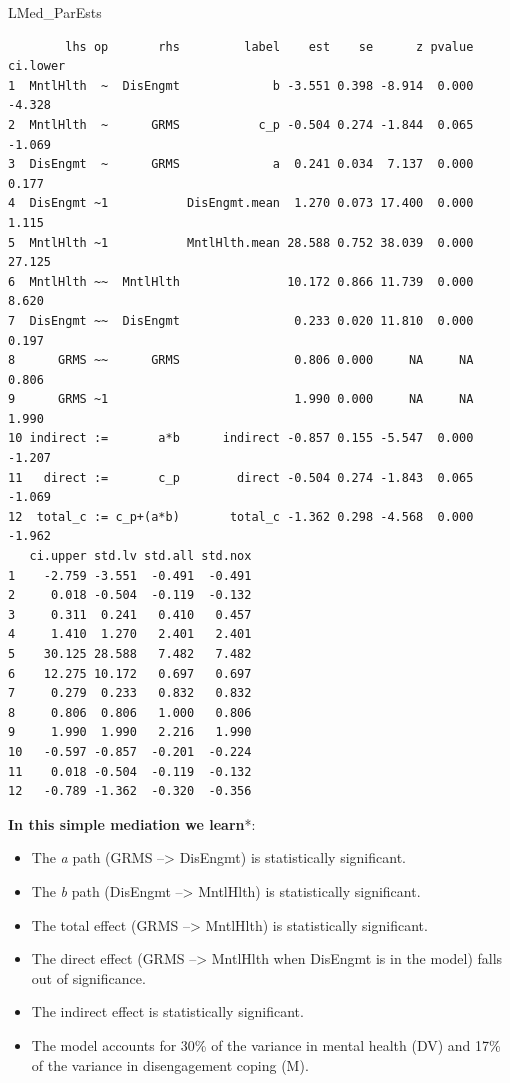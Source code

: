 \documentclass[
  11pt,
]{book}
\newenvironment{Shaded}{\begin{snugshade}}{\end{snugshade}}
\newcommand{\NormalTok}[1]{#1}
\providecommand{\tightlist}{%
  \setlength{\itemsep}{0pt}\setlength{\parskip}{0pt}}
\begin{document}
\begin{Shaded}
\begin{Highlighting}[]
\NormalTok{LMed\_ParEsts}
\end{Highlighting}
\end{Shaded}

\begin{verbatim}
        lhs op       rhs         label    est    se      z pvalue ci.lower
1  MntlHlth  ~  DisEngmt             b -3.551 0.398 -8.914  0.000   -4.328
2  MntlHlth  ~      GRMS           c_p -0.504 0.274 -1.844  0.065   -1.069
3  DisEngmt  ~      GRMS             a  0.241 0.034  7.137  0.000    0.177
4  DisEngmt ~1           DisEngmt.mean  1.270 0.073 17.400  0.000    1.115
5  MntlHlth ~1           MntlHlth.mean 28.588 0.752 38.039  0.000   27.125
6  MntlHlth ~~  MntlHlth               10.172 0.866 11.739  0.000    8.620
7  DisEngmt ~~  DisEngmt                0.233 0.020 11.810  0.000    0.197
8      GRMS ~~      GRMS                0.806 0.000     NA     NA    0.806
9      GRMS ~1                          1.990 0.000     NA     NA    1.990
10 indirect :=       a*b      indirect -0.857 0.155 -5.547  0.000   -1.207
11   direct :=       c_p        direct -0.504 0.274 -1.843  0.065   -1.069
12  total_c := c_p+(a*b)       total_c -1.362 0.298 -4.568  0.000   -1.962
   ci.upper std.lv std.all std.nox
1    -2.759 -3.551  -0.491  -0.491
2     0.018 -0.504  -0.119  -0.132
3     0.311  0.241   0.410   0.457
4     1.410  1.270   2.401   2.401
5    30.125 28.588   7.482   7.482
6    12.275 10.172   0.697   0.697
7     0.279  0.233   0.832   0.832
8     0.806  0.806   1.000   0.806
9     1.990  1.990   2.216   1.990
10   -0.597 -0.857  -0.201  -0.224
11    0.018 -0.504  -0.119  -0.132
12   -0.789 -1.362  -0.320  -0.356
\end{verbatim}

\textbf{In this simple mediation we learn}*:

\begin{itemize}
\tightlist
\item
  The \emph{a} path (GRMS --\textgreater{} DisEngmt) is statistically significant.
\item
  The \emph{b} path (DisEngmt --\textgreater{} MntlHlth) is statistically significant.
\item
  The total effect (GRMS --\textgreater{} MntlHlth) is statistically significant.
\item
  The direct effect (GRMS --\textgreater{} MntlHlth when DisEngmt is in the model) falls out of significance.
\item
  The indirect effect is statistically significant.
\item
  The model accounts for 30\% of the variance in mental health (DV) and 17\% of the variance in disengagement coping (M).
\end{itemize}
\end{document}
